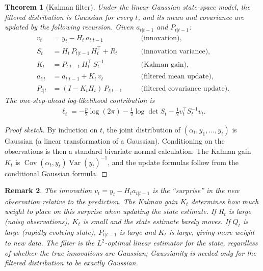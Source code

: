\documentclass{report}
\theoremstyle{spacedplain}
\newtheorem{theorem}{Theorem}[section]
\theoremstyle{spaceddefinition}
\theoremstyle{spacedremark}
\newtheorem{remark}[theorem]{Remark}
\begin{document}
\begin{theorem}[Kalman filter]
Under the linear Gaussian state-space model, the filtered distribution is Gaussian for every $t$, and its mean and covariance are updated by the following recursion. Given $a_{t|t-1}$ and $P_{t|t-1}$:
\begin{align}
    v_t &= y_t - H_t\,a_{t|t-1} &\quad &\text{(innovation)}, \\
    S_t &= H_t\,P_{t|t-1}\,H_t^\top + R_t &\quad &\text{(innovation variance)}, \\
    K_t &= P_{t|t-1}\,H_t^\top\,S_t^{-1} &\quad &\text{(Kalman gain)}, \\
    a_{t|t} &= a_{t|t-1} + K_t\,v_t &\quad &\text{(filtered mean update)}, \\
    P_{t|t} &= (I - K_t H_t)\,P_{t|t-1} &\quad &\text{(filtered covariance update)}.
\end{align}
The one-step-ahead log-likelihood contribution is
\begin{align}
    \ell_t = -\tfrac{p}{2}\log(2\pi) - \tfrac{1}{2}\log\det S_t
    - \tfrac{1}{2}v_t^\top S_t^{-1} v_t.
\end{align}
\end{theorem}
 
\begin{proof}[Proof sketch]
By induction on $t$, the joint distribution of $(\alpha_t, y_1,\ldots,y_t)$ is Gaussian (a linear transformation of a Gaussian). Conditioning on the observations is then a standard bivariate normal calculation. The Kalman gain $K_t$ is $\operatorname{Cov}(\alpha_t, y_t) \operatorname{Var}(y_t)^{-1}$, and the update formulas follow from the conditional Gaussian formula.
\end{proof}
 
\begin{remark}
The innovation $v_t = y_t - H_t a_{t|t-1}$ is the ``surprise'' in the new observation relative to the prediction. The Kalman gain $K_t$ determines how much weight to place on this surprise when updating the state estimate. If $R_t$ is large (noisy observations), $K_t$ is small and the state estimate barely moves. If $Q_t$ is large (rapidly evolving state), $P_{t|t-1}$ is large and $K_t$ is large, giving more weight to new data. The filter is the $L^2$-optimal linear estimator for the state, regardless of whether the true innovations are Gaussian; Gaussianity is needed only for the filtered distribution to be exactly Gaussian.
\end{remark}
 
\end{document}
